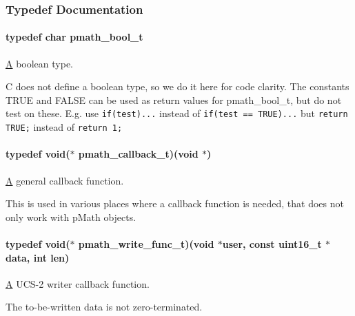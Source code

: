 \subsubsection{Typedef Documentation}
\hypertarget{group__general__types_gc92090cb0b56345d6c379ed2341d4ef4}{
\paragraph[{pmath\_\-bool\_\-t}]{\setlength{\rightskip}{0pt plus 5cm}typedef char {\bf pmath\_\-bool\_\-t}}\hfill}
\label{group__general__types_gc92090cb0b56345d6c379ed2341d4ef4}


\hyperlink{class_a}{A} boolean type. 

C does not define a boolean type, so we do it here for code clarity. The constants TRUE and FALSE can be used as return values for pmath\_\-bool\_\-t, but do not test on these. E.g. use {\tt if(test)...} instead of {\tt if(test == TRUE)...} but {\tt return TRUE;} instead of {\tt return 1;} \hypertarget{group__general__types_ge1a454657f18f3cc54508adeccccbcbc}{
\paragraph[{pmath\_\-callback\_\-t}]{\setlength{\rightskip}{0pt plus 5cm}typedef void($\ast$ {\bf pmath\_\-callback\_\-t})(void $\ast$)}\hfill}
\label{group__general__types_ge1a454657f18f3cc54508adeccccbcbc}


\hyperlink{class_a}{A} general callback function. 

This is used in various places where a callback function is needed, that does not only work with pMath objects. \hypertarget{group__general__types_g781a2e0445795bb4e091470fb20497cc}{
\paragraph[{pmath\_\-write\_\-func\_\-t}]{\setlength{\rightskip}{0pt plus 5cm}typedef void($\ast$ {\bf pmath\_\-write\_\-func\_\-t})(void $\ast$user, const uint16\_\-t $\ast$data, int len)}\hfill}
\label{group__general__types_g781a2e0445795bb4e091470fb20497cc}


\hyperlink{class_a}{A} UCS-2 writer callback function. 

The to-be-written data is not zero-terminated. 